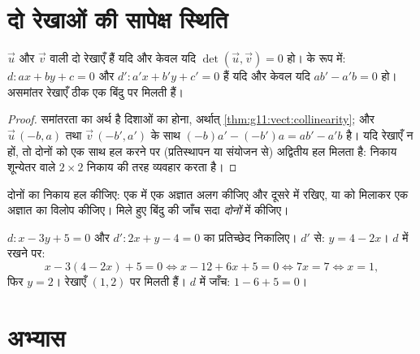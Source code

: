 \section{दो रेखाओं की सापेक्ष स्थिति}

\begin{proposition}[समांतर या प्रतिच्छेदी]\label{prop:g11:vect:positions}
 $\vec u$ और $\vec v$ वाली दो रेखाएँ  हैं यदि और केवल यदि $\det(\vec u, \vec v) = 0$
हो।  के रूप में: $d : ax + by + c =
0$ और $d' : a'x + b'y + c' = 0$  हैं यदि और केवल यदि $ab' - a'b = 0$ हो।
असमांतर रेखाएँ ठीक एक बिंदु पर मिलती हैं।
\end{proposition}

\begin{proof}
समांतरता का अर्थ है दिशाओं का  होना, अर्थात् \cref{thm:g11:vect:collinearity}; और $\vec u\,(-b, a)$ तथा $\vec v\,(-b', a')$
के साथ  $(-b)a' - (-b')a = ab' - a'b$ है। यदि रेखाएँ  न हों, तो दोनों  को एक साथ
हल करने पर (प्रतिस्थापन या संयोजन से) अद्वितीय हल मिलता है: निकाय शून्येतर
 वाले $2 \times 2$ निकाय की तरह व्यवहार करता है।
\end{proof}

\begin{method}[दो रेखाओं का प्रतिच्छेद]\label{met:g11:vect:intersection}
दोनों  का निकाय हल कीजिए: एक  में एक अज्ञात अलग कीजिए और दूसरे
में रखिए, या  को मिलाकर एक अज्ञात का विलोप कीजिए। मिले हुए बिंदु की
जाँच सदा \emph{दोनों}  में कीजिए।
\end{method}

\begin{example}\label{ex:g11:vect:intersection}
$d: x - 3y + 5 = 0$ और $d': 2x + y - 4 = 0$ का प्रतिच्छेद निकालिए। $d'$ से: $y = 4 - 2x$। $d$ में रखने पर:
\[
x - 3(4 - 2x) + 5 = 0
\iff x - 12 + 6x + 5 = 0
\iff 7x = 7
\iff x = 1,
\]
फिर $y = 2$। रेखाएँ $(1, 2)$ पर मिलती हैं। $d$ में जाँच: $1 - 6 + 5 = 0$।
\end{example}

\section{अभ्यास}

